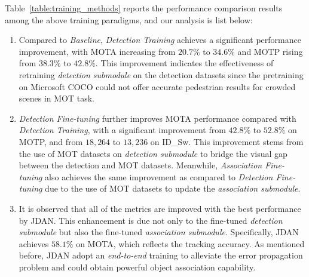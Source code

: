 \documentclass[acmsmall]{acmart}
\begin{document}
{
Table~\ref{table:training_methods} reports the performance comparison results among the above training paradigms, and our analysis is list below: 
}
\begin{enumerate} 
\item Compared to \emph{Baseline}, \emph{Detection Training} achieves a significant performance improvement, with MOTA increasing from $20.7\%$ to $34.6\%$ and MOTP rising from $38.3\%$ to $42.8\%$.
This improvement indicates the effectiveness of retraining \emph{detection submodule} on the detection datasets since the pretraining on Microsoft COCO could not offer accurate pedestrian results for crowded scenes in MOT task.

\item {\emph{Detection Fine-tuning} further improves MOTA performance compared with \emph{Detection Training}}, with a significant improvement from $42.8\%$ to $52.8\%$ on MOTP, and from $18,264$ to $13,236$ on ID\_Sw. 
{
This improvement stems from the use of MOT datasets on \emph{detection submodule} to bridge the visual gap between the detection and MOT datasets.
Meanwhile, \emph{Association Fine-tuning} also achieves the same improvement as compared to \emph{Detection Fine-tuning} due to the use of MOT datasets to update the \emph{association submodule}.
}

\item It is observed that all of the metrics are improved with the best performance by JDAN. 
This enhancement is due not only to the fine-tuned \emph{detection submodule} but also the fine-tuned \emph{association submodule}. 
Specifically, JDAN achieves $58.1\%$ on MOTA, which reflects the tracking accuracy. 
As mentioned before, JDAN adopt an \emph{end-to-end} training to alleviate the error propagation problem and could obtain powerful object association capability. 
\end{enumerate}
\end{document}
